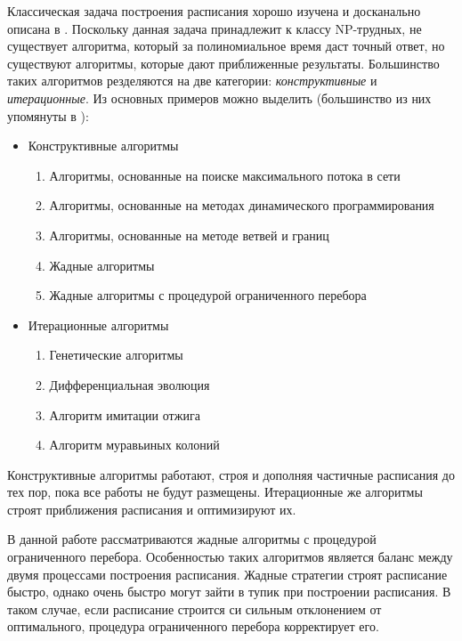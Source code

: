 Классическая задача построения расписания хорошо изучена и досканально описана в \cite{Coffman}. Поскольку данная задача принадлежит к классу NP-трудных, не существует алгоритма, который за полиномиальное время даст точный ответ, но существуют алгоритмы, которые дают приближенные результаты. Большинство таких алгоритмов резделяются на две категории: \textit{конструктивные} и \textit{итерационные}. Из основных примеров можно выделить (большинство из них упомянуты в \cite{Kostenko_2017}):
\begin{itemize}
    \item Конструктивные алгоритмы
    \begin{enumerate}
        \item Алгоритмы, основанные на поиске максимального потока в сети
        \item Алгоритмы, основанные на методах динамического программирования
        \item Алгоритмы, основанные на методе ветвей и границ
        \item Жадные алгоритмы
        \item Жадные алгоритмы с процедурой ограниченного перебора
    \end{enumerate}
    \item Итерационные алгоритмы
    \begin{enumerate}
        \item Генетические алгоритмы
        \item Дифференциальная эволюция
        \item Алгоритм имитации отжига
        \item Алгоритм муравьиных колоний
    \end{enumerate}
\end{itemize}
\par
Конструктивные алгоритмы работают, строя и дополняя частичные расписания до тех пор, пока все работы не будут размещены. Итерационные же алгоритмы строят приближения расписания и оптимизируют их.
\par
В данной работе рассматриваются жадные алгоритмы с процедурой ограниченного перебора. Особенностью таких алгоритмов является баланс между двумя процессами построения расписания. Жадные стратегии строят расписание быстро, однако очень быстро могут зайти в тупик при построении расписания. В таком случае, если расписание строится си сильным отклонением от оптимального, процедура ограниченного перебора корректирует его.